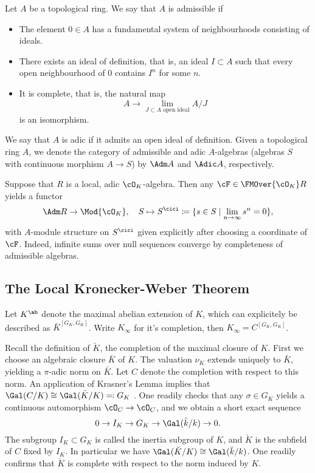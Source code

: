 \documentclass[../main.tex]{subfiles}
\begin{document}
\begin{defi}
  Let $A$ be a topological ring. We say that $A$ is admissible if
  \begin{itemize}
    \item The element $0 \in A$ has a fundamental system of neighbourhoods
      consisting of ideals.
    \item There exists an ideal of definition, that is, an ideal $I \subset A$ such
      that every open neighbourhood of $0$ contains $I^n$ for some $n$.
    \item It is complete, that is, the natural map
      \begin{equation*}
        A \to \lim_{J \subset A \text{ open ideal}} A/J
      \end{equation*}
      is an isomorphism.
  \end{itemize}
  We say that $A$ is adic if it admits an open ideal of definition.
  Given a topological ring $A$, we denote the category of admissible 
  and adic $A$-algebras (algebras $S$ with continuous morphism $A \to S$) by
  $\Adm A$ and $\Adic A$, respectively.
\end{defi}

Suppose that $R$ is a local, adic $\cO_K$-algebra. Then any $\cF \in \FMOver
{\cO_K} R$ yields a functor 
\begin{equation*}
  \Adm R \to \Mod {\cO_K}, \quad S \mapsto S^\cici \coloneqq \{s \in S \mid
  \lim_{n \to \infty} s^n = 0\},
\end{equation*}
with $A$-module structure on $S^\cici$ given explicitly after choosing a
coordinate of $\cF$. Indeed, infinite sums over null sequences converge 
by completeness of admissible algebras.



\subsection{The Local Kronecker-Weber Theorem} %
\label{ssub:Formal Modules over algebraically closed fields}

Let $K^\ab$ denote the maximal abelian extension of $K$, which can explicitely
be described as $\bar K^{[G_K, G_K]}$. Write $K_\infty$ for it's completion,
then $K_\infty = C^{[G_K, G_K]}$. 

Recall the definition of $\breve K$, the completion of the maximal closure of
$K$. First we choose an algebraic closure $\bar K$ of $K$. The valuation 
$\nu_K$ extends uniquely to $\bar K$, yielding a $\pi$-adic norm on
$\bar K$. Let $C$ denote the completion with respect to this norm. 
An application of Krasner's Lemma implies that $\Gal(C/K) \cong \Gal(\bar K/K)
\eqqcolon G_K$
. One readily checks that any $\sigma \in G_K$ yields a 
continuous automorphism $\cO_C \to \cO_C$, and we obtain a short exact sequence 
\begin{equation*}
  0 \to I_K \to G_K \to \Gal(\bar k /k) \to 0.
\end{equation*}
The subgroup $I_K \subset G_K$ is called the inertia subgroup of $K$,
and $\breve K$ is the subfield of $C$ fixed by $I_K$. In particular we have 
$\Gal(\breve K /K) \cong \Gal(\bar k /k)$. One readily confirms that 
$\breve K$ is complete with respect to the norm induced by $K$. 
\end{document}
